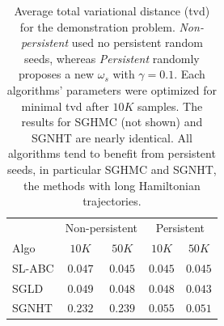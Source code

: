\documentclass[]{article}
\begin{document}
\begin{table}[h]
\caption{Average total variational distance (tvd) for the demonstration problem.  {\em Non-persistent} used no persistent random seeds, whereas {\em Persistent} randomly proposes a new $\omega_s$ with $\gamma=0.1$. Each algorithms' parameters were optimized for minimal tvd after $10K$ samples.  The results for SGHMC (not shown) and SGNHT are nearly identical.  All algorithms tend to benefit from persistent seeds, in particular SGHMC and SGNHT, the methods with long Hamiltonian trajectories.}
\label{tab:exp-posterior}
\begin{center}
\begin{tabular}{l|c|c||c|c|}
  \cline{2-5}
 & \multicolumn{2}{|c||}{Non-persistent} & \multicolumn{2}{c|}{Persistent} \\
 \cline{1-5} 
\multicolumn{1}{|l|}{Algo} & $10K$ & $50K$ & $10K$ & $50K$ \\ \hline \hline 
\multicolumn{1}{|l|}{SL-ABC} & $0.047$ & $0.045$ & $0.045$ & $0.045$ \\
\multicolumn{1}{|l|}{SGLD} & $0.049$ & $0.048$ & $0.048$ & $0.043$ \\
\multicolumn{1}{|l|}{SGNHT} & $0.232$ & $0.239$ & $0.055$ & $0.051$ \\\hline 
\end{tabular}
\end{center}
\end{table}
\end{document}
